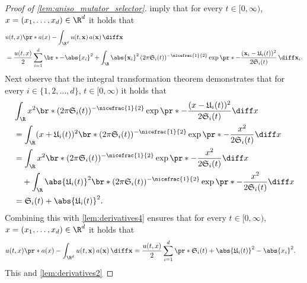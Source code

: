 \begin{proof}[Proof of \cref{lem:aniso_mutator_selector}]
	imply that 
		for every
			$t \in [0,\infty)$,
			$x = (x_1, \dots,x_d)\in \R^d$
		it holds that 
		\begin{equation}\label{lem:derivatives4}
		\begin{split}
			&
			u(t,x)\pr*{ a(x) - \int_{\R^d} u(t,\mathbf{x})\, a(\mathbf{x}) \, \diff\mathbf{x} } 
			\\ &= 
			\frac{u(t,x)}{2} \sum_{i=1}^d \br*{- \abs{x_i}^2 + \int_\R  \abs{\mathbf{x}_i}^2 \, (2\pi    \mathfrak{S}_i(t))^{-\nicefrac{1}{2}}    \exp\pr*{ - \frac{(\mathbf{x}_i -\mathfrak{U}_i(t) )^2}{2\mathfrak{S}_i(t)}} \,\diff\mathbf{x}_i }
			.
		\end{split}
		\end{equation}
	Next observe that 
		the integral transformation theorem 
	demonstrates that 
		for every
			$i \in \{1,2, \dots,d\}$,
			$t \in [0,\infty)$
		it holds that
		\begin{equation}
		\begin{aligned}
			&
			\int_\R  x^2 \br*{ (2\pi    \mathfrak{S}_i(t))^{-\nicefrac{1}{2}}    \exp\pr*{ - \frac{( x -\mathfrak{U}_i(t) )^2}{2\mathfrak{S}_i(t)}} } \diff x 
			\\ &= \int_\R   (x + \mathfrak{U}_i(t))^2 \br*{ (2\pi    \mathfrak{S}_i(t))^{-\nicefrac{1}{2}}    \exp\pr*{ - \frac{x^2}{2\mathfrak{S}_i(t)}} } \diff x\\
			&= \int_\R   x ^2 \br*{ (2\pi    \mathfrak{S}_i(t))^{-\nicefrac{1}{2}}    \exp\pr*{ - \frac{x^2}{2\mathfrak{S}_i(t)}} }  \diff x 
			\\&\quad 
			+ \int_\R  \abs{\mathfrak{U}_i(t)}^2 \br*{ (2\pi    \mathfrak{S}_i(t))^{-\nicefrac{1}{2}}    \exp\pr*{ - \frac{x^2}{2\mathfrak{S}_i(t)}} } \diff x
			\\ &=
			\mathfrak{S}_i(t) + \abs{\mathfrak{U}_i(t)}^2
			.
		\end{aligned}
		\end{equation}
	Combining 
		this 
	with 
		\eqref{lem:derivatives4} 
	ensures that 
		for every
			$t \in [0,\infty)$,
			$x = (x_1, \dots,x_d)\in \R^d$
		it holds that 
		\begin{equation}\label{lem:derivatives3}
		\begin{split}
			&
			u(t,x)\pr*{ a(x) - \int_{\R^d} u(t,\mathbf{x})\, a(\mathbf{x}) \, \diff\mathbf{x} }
			=
			\frac{u(t,x)}{2} \sum_{i=1}^d \pr*{ \mathfrak{S}_i(t) + \abs{\mathfrak{U}_i(t)}^2 - \abs{x_i}^2 } 
			.
		\end{split}
		\end{equation}
		This 
		and \eqref{lem:derivatives2} 

\end{proof}
